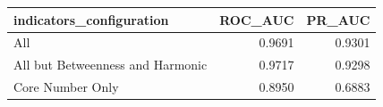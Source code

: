 \begin{tabular}{lrr}
\toprule
indicators_configuration & ROC_AUC & PR_AUC \\
\midrule
All & 0.9691 & 0.9301 \\
All but Betweenness and Harmonic & 0.9717 & 0.9298 \\
Core Number Only & 0.8950 & 0.6883 \\
\bottomrule
\end{tabular}
